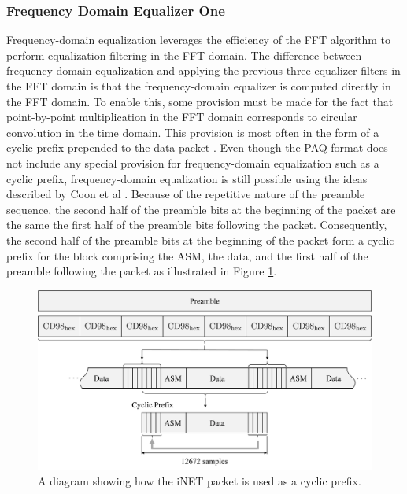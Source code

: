 \subsubsection{Frequency Domain Equalizer One}
Frequency-domain equalization leverages the efficiency of the FFT algorithm to perform equalization filtering in the FFT domain.
The difference between frequency-domain equalization and applying the previous three equalizer filters in the FFT domain is that the frequency-domain equalizer is computed directly in the FFT domain.
To enable this, some provision must be made for the fact that point-by-point multiplication in the FFT domain corresponds to circular convolution in the time domain.
This provision is most often in the form of a cyclic prefix prepended to the data packet \cite{sari1994frequency,ng2007turbo,al2008single,proakis-salehi:2008}.
Even though the PAQ format does not include any special provision for frequency-domain equalization such as a cyclic prefix, frequency-domain equalization is still possible using the ideas described by Coon et al \cite{coon-sandell-beach-mcgeehan:2006}.
Because of the repetitive nature of the preamble sequence, the second half of the preamble bits at the beginning of the packet are the same the first half of the preamble bits following the packet.
Consequently, the second half of the preamble bits at the beginning of the packet form a cyclic prefix for the block comprising the ASM, the data, and the first half of the preamble following the packet as illustrated in Figure \ref{fig:cyclicPrefix_MDR}.
\begin{figure}
	\centering\includegraphics[width=10.63in/100*55]{figures/eq_equations/cyclicPrefix.pdf}
	\caption{A diagram showing how the iNET packet is used as a cyclic prefix.}
	\label{fig:cyclicPrefix_MDR}
\end{figure}

